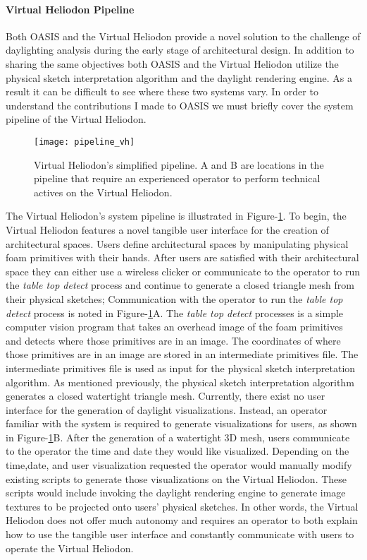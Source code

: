 \paragraph{Virtual Heliodon Pipeline}
Both OASIS and the Virtual Heliodon provide a novel solution to the challenge of daylighting analysis during the early stage of architectural design.
In addition to sharing the same objectives both OASIS and the Virtual Heliodon utilize the physical sketch interpretation algorithm and the daylight rendering engine.
As a result it can be difficult to see where these two systems vary.
In order to understand the contributions I made to OASIS we must briefly cover the system pipeline of the Virtual Heliodon.
\begin{figure}[!ht]
\centering
\caption[The Virtual Heliodon's simplified pipeline.]{Virtual Heliodon's simplified pipeline. A and B are locations in the pipeline that require an experienced operator to perform technical actives on the Virtual Heliodon. }
\label{fig:pipeline_vh}
\texttt{[image: pipeline\_vh]}
\end{figure}
The Virtual Heliodon's system pipeline is illustrated in Figure-\ref{fig:pipeline_vh}.
To begin, the Virtual Heliodon features a novel tangible user interface for the creation of architectural spaces.
Users define architectural spaces by manipulating physical foam primitives with their hands.
After users are satisfied with their architectural space they can either use a wireless clicker or communicate to the operator to run the \textit{table top detect} process and continue to generate a closed triangle mesh from their physical sketches; Communication with the operator to run the \textit{table top detect} process is noted in Figure-\ref{fig:pipeline_vh}A.
The \textit{table top detect} processes is a simple computer vision program that takes an overhead image of the foam primitives and detects where those primitives are in an image.
The coordinates of where those primitives are in an image are stored in an intermediate primitives file. The intermediate primitives file is used as input for the physical sketch interpretation algorithm. As mentioned previously, the physical sketch interpretation algorithm generates a closed watertight triangle mesh.
Currently, there exist no user interface for the generation of daylight visualizations.
Instead, an operator familiar with the system is required to generate visualizations for users, as shown in Figure-\ref{fig:pipeline_vh}B.
After the generation of  a watertight 3D mesh, users communicate to the operator the time and date they would like visualized. 
Depending on the time,date, and user visualization requested the operator would manually modify existing scripts to generate those visualizations on the Virtual Heliodon.
These scripts would include invoking the daylight rendering engine to generate image textures to be projected onto users' physical sketches.
In other words, the Virtual Heliodon does not offer much autonomy and requires an operator to both explain how to use the tangible user interface and constantly communicate with users to operate the Virtual Heliodon.


